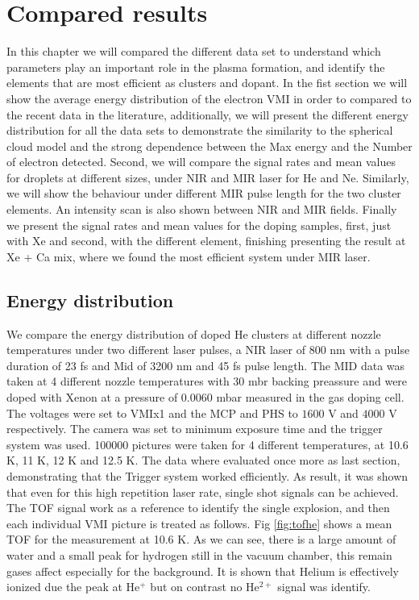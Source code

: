 \chapter{Compared results}

In this chapter we will compared the different data set to understand which parameters play an important role in the plasma formation, and identify the elements that are most efficient as clusters and dopant.
In the fist section we will show the average energy distribution of the electron VMI in order to compared to the recent data in the literature, additionally, we will present the different energy distribution for all the data sets to demonstrate the similarity to the spherical cloud model and the strong dependence between the Max energy and the Number of electron detected.
Second, we will compare the signal rates and mean values for droplets at different sizes, under NIR and MIR laser for He and Ne. Similarly, we will show the behaviour under different MIR pulse length for the two cluster elements. An intensity scan is also shown between NIR and MIR fields.  Finally we present the signal rates and mean values for the doping samples, first, just with Xe and second, with the different element, finishing presenting the result at Xe + Ca mix, where we found the most efficient system under MIR laser. 

\section{Energy distribution}

We compare the energy distribution of doped He clusters at different nozzle temperatures under two different laser pulses, a NIR laser of 800 nm with a pulse duration of 23 fs and Mid of 3200 nm and 45 fs pulse length.
The MID data was taken at 4 different nozzle temperatures with 30 mbr backing preassure and were doped with Xenon at a pressure of $0.0060$ mbar measured in the gas doping cell. The voltages were set to VMIx1  and the MCP and PHS to $1600$ V and $4000$ V respectively. The camera was set to minimum exposure time and the trigger system was used. 100000 pictures were taken for 4 different temperatures, at 10.6 K, 11 K, 12 K and 12.5 K. The data where evaluated once more as last section, demonstrating that the Trigger system worked efficiently. As result, it was shown that even for this high repetition laser rate, single shot signals can be achieved. The TOF signal work as a reference to identify the single explosion, and then each individual VMI picture is treated as follows. Fig \ref{fig:tofhe} shows a mean TOF for the measurement at 10.6 K. As we can see, there is a large amount of water and a small peak for hydrogen still in the vacuum chamber, this remain gases affect especially for the background. It is shown that Helium is effectively ionized due the peak at He$^{+}$ but on contrast no He$^{2+}$ signal was identify.

